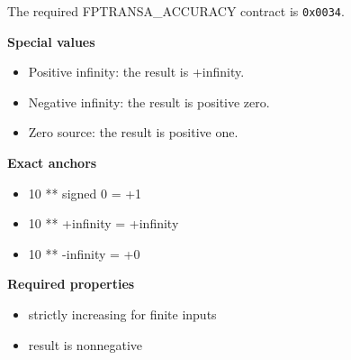 The required FPTRANSA\_ACCURACY contract is \texttt{0x0034}.

\textbf{Special values}\par
\begin{itemize}
\item Positive infinity: the result is +infinity.
\item Negative infinity: the result is positive zero.
\item Zero source: the result is positive one.
\end{itemize}

\textbf{Exact anchors}\par
\begin{itemize}
\item 10 ** signed 0 = +1
\item 10 ** +infinity = +infinity
\item 10 ** -infinity = +0
\end{itemize}

\textbf{Required properties}\par
\begin{itemize}
\item strictly increasing for finite inputs
\item result is nonnegative
\end{itemize}
